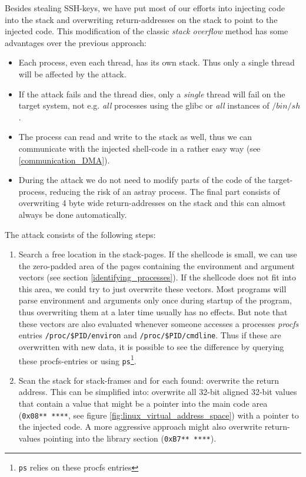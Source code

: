 \label{overwriting_stack} Besides stealing SSH-keys, we have put most of our
efforts into injecting code into the stack and overwriting return-addresses on
the stack to point to the injected code. This modification of the classic
\emph{stack overflow} method has some advantages over the previous approach:

\begin{itemize}

	\item Each process, even each thread, has its own stack. Thus only a
		single thread will be affected by the attack.

	\item If the attack fails and the thread dies, only a \emph{single}
		thread will fail on the target system, not e.g. \emph{all}
		processes using the glibc or \emph{all} instances of $/bin/sh$.

	\item The process can read and write to the stack as well, thus we can
		communicate with the injected shell-code in a rather easy way
		(see \ref{communication_DMA}).

	\item During the attack we do not need to modify parts of the code of
		the target-process, reducing the risk of an astray process. The
		final part consists of overwriting 4 byte wide return-addresses
		on the stack and this can almost always be done automatically.

\end{itemize}

The attack consists of the following steps:

\begin{enumerate}

	\item Search a free location in the stack-pages. If the shellcode is
		small, we can use the zero-padded area of the pages containing
		the environment and argument vectors (see section
		\ref{identifying_processes}). If the shellcode does not fit into
		this area, we could try to just overwrite these vectors. Most
		programs will parse environment and arguments only once during startup of
		the program, thus overwriting them at a later time usually has no effects.
		But note that these vectors are also evaluated whenever someone accesses a
		processes \emph{procfs} entries \texttt{/proc/\$PID/environ} and
		\texttt{/proc/\$PID/cmdline}. Thus if these are overwritten with new data,
		it is possible to see the difference by querying these procfs-entries or
		using \texttt{ps}\footnote{\texttt{ps} relies on these procfs entries}.


	\item Scan the stack for stack-frames and for each found: overwrite the
		return address. This can be simplified into: overwrite all
		32-bit aligned 32-bit values that contain a value that might be
		a pointer into the main code area (\texttt{0x08**~****}, see
		figure \ref{fig:linux_virtual_address_space}) with a pointer to
		the injected code.  A more aggressive approach might also
		overwrite return-values pointing into the library section
		(\texttt{0xB7**~****}).

\end{enumerate}

